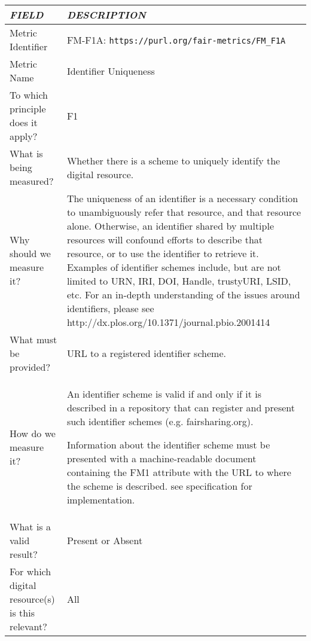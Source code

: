 \documentclass[english]{article}
\begin{document}
\begin{longtable}{|p{5cm}|p{9cm}|}
\hline
\emph{FIELD} & \emph{DESCRIPTION} \\
\hline
Metric Identifier &   FM-F1A: \verb"https://purl.org/fair-metrics/FM_F1A"
 \\


\hline
Metric Name &   Identifier Uniqueness \\



\hline
To which principle does it apply? &   F1\\



\hline
What is being measured? & Whether there is a scheme to uniquely identify the digital resource.\\



\hline
Why should we measure it? & 
The uniqueness of an identifier is a necessary condition to unambiguously refer that resource, and that resource alone. Otherwise, an identifier shared by multiple resources will confound efforts to describe that resource, or to use the identifier to retrieve it. Examples of identifier schemes include, but are not limited to URN, IRI, DOI, Handle, trustyURI, LSID, etc. For an in-depth understanding of the issues around identifiers, please see http://dx.plos.org/10.1371/journal.pbio.2001414  
\\



\hline
What must be provided? &  URL to a registered identifier scheme. \\



\hline
How do we measure it? &  
An identifier scheme is valid if and only if it is described in a repository that can register and present such identifier schemes (e.g. fairsharing.org). \newline
\newline

Information about the identifier scheme must be presented with a machine-readable document containing the FM1 attribute with the URL to where the scheme is described.  see specification for implementation.
\\



\hline
What is a valid result? &  
Present or Absent
\\



\hline
For which digital resource(s) is this relevant? &  All\\




\end{longtable}
\end{document}
